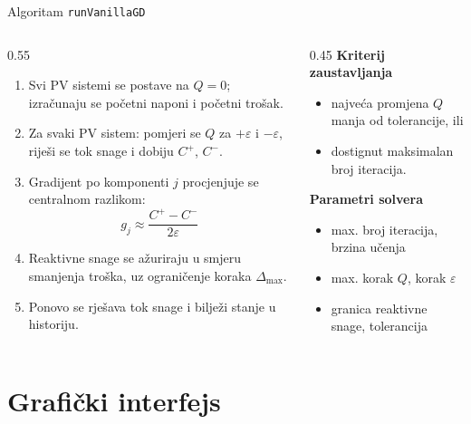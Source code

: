 \documentclass[10pt,aspectratio=169]{beamer}
\begin{document}
\begin{frame}{Algoritam \texttt{runVanillaGD}}
  \begin{columns}[T,onlytextwidth]
    \begin{column}{0.55\textwidth}
      \begin{enumerate}
        \small
        \item Svi PV sistemi se postave na $Q=0$; izračunaju se početni naponi i početni trošak.
        \item Za svaki PV sistem: pomjeri se $Q$ za $+\varepsilon$ i $-\varepsilon$, riješi se tok snage i dobiju $C^+$, $C^-$.
        \item Gradijent po komponenti $j$ procjenjuje se centralnom razlikom:
        \[
          g_j \approx \frac{C^+ - C^-}{2\varepsilon}
        \]
        \item Reaktivne snage se ažuriraju u smjeru smanjenja troška, uz ograničenje koraka $\Delta_{\max}$.
        \item Ponovo se rješava tok snage i bilježi stanje u historiju.
      \end{enumerate}
    \end{column}
    \begin{column}{0.45\textwidth}
      \textbf{Kriterij zaustavljanja}
      \footnotesize
      \begin{itemize}
        \item najveća promjena $Q$ manja od tolerancije, ili
        \item dostignut maksimalan broj iteracija.
      \end{itemize}
      \vspace{0.6em}
      \textbf{Parametri solvera}
      \footnotesize
      \begin{itemize}
        \item max. broj iteracija, brzina učenja
        \item max. korak $Q$, korak $\varepsilon$
        \item granica reaktivne snage, tolerancija
      \end{itemize}
    \end{column}
  \end{columns}
\end{frame}

\section{Grafički interfejs}
\end{document}
